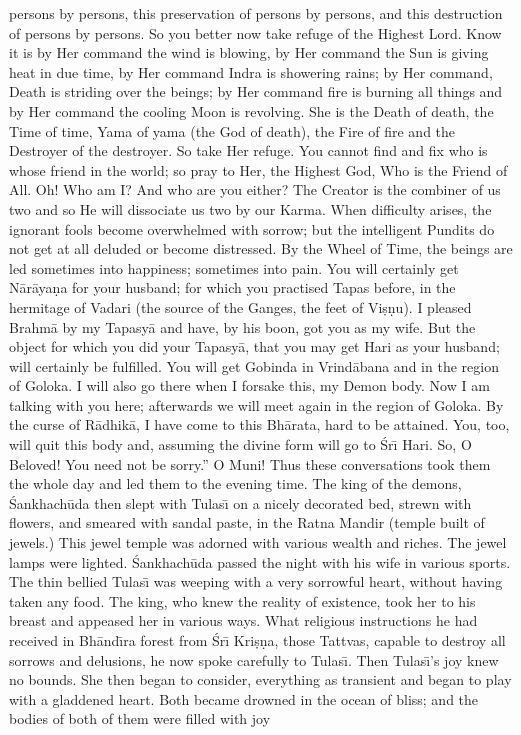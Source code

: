persons by persons, this preservation of persons by persons, and this destruction of persons by persons. So you better now take refuge of the Highest Lord. Know it is by Her command the wind is blowing, by Her command the Sun is giving heat in due time, by Her command Indra is showering rains; by Her command, Death is striding over the beings; by Her command fire is burning all things and by Her command the cooling Moon is revolving. She is the Death of death, the Time of time, Yama of yama (the God of death), the Fire of fire and the Destroyer of the destroyer. So take Her refuge. You cannot find and fix who is whose friend in the world; so pray to Her, the Highest God, Who is the Friend of All. Oh! Who am I? And who are you either? The Creator is the combiner of us two and so He will dissociate us two by our Karma. When difficulty arises, the ignorant fools become overwhelmed with sorrow; but the intelligent Pundits do not get at all deluded or become distressed. By the Wheel of Time, the beings are led sometimes into happiness; sometimes into pain. You will certainly get N\=ar\=aya\d{n}a for your husband; for which you practised Tapas before, in the hermitage of Vadari (the source of the Ganges, the feet of Vi\d{s}\d{n}u). I pleased Brahm\=a by my Tapasy\=a and have, by his boon, got you as my wife. But the object for which you did your Tapasy\=a, that you may get Hari as your husband; will certainly be fulfilled. You will get Gobinda in Vrind\=abana and in the region of Goloka. I will also go there when I forsake this, my Demon body. Now I am talking with you here; afterwards we will meet again in the region of Goloka. By the curse of R\=adhik\=a, I have come to this Bh\=arata, hard to be attained. You, too, will quit this body and, assuming the divine form will go to \'Sr\={\i} Hari. So, O Beloved! You need not be sorry.'' O Muni! Thus these conversations took them the whole day and led them to the evening time. The king of the demons, \'Sankhach\=uda then slept with Tulas\={\i} on a nicely decorated bed, strewn with flowers, and smeared with sandal paste, in the Ratna Mandir (temple built of jewels.) This jewel temple was adorned with various wealth and riches. The jewel lamps were lighted. \'Sankhach\=uda passed the night with his wife in various sports. The thin bellied Tulas\={\i} was weeping with a very sorrowful heart, without having taken any food. The king, who knew the reality of existence, took her to his breast and appeased her in various ways. What religious instructions he had received in Bh\=and\={\i}ra forest from \'Sr\={\i} Kri\d{s}\d{n}a, those Tattvas, capable to destroy all sorrows and delusions, he now spoke carefully to Tulas\={\i}. Then Tulas\={\i}'s joy knew no bounds. She then began to consider, everything as transient and began to play with a gladdened heart. Both became drowned in the ocean of bliss; and the bodies of both of them were filled with joy

